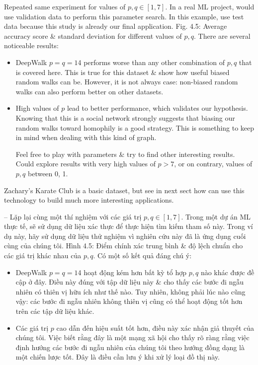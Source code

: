 \documentclass{article}
\begin{document}
\begin{itemize}
\begin{itemize}
        Repeated same experiment for values of $p,q\in[1,7]$. In a real ML project, would use validation data to perform this parameter search. In this example, use test data because this study is already our final application. {\sf Fig. 4.5: Average accuracy score \& standard deviation for different values of $p,q$.} There are several noticeable results:
        \begin{itemize}
            \item DeepWalk $p = q = 1$4 performs worse than any other combination of $p,q$ that is covered here. This is true for this dataset \& show how useful biased random walks can be. However, it is not always case: non-biased random walks can also perform better on other datasets.
            \item High values of $p$ lead to better performance, which validates our hypothesis. Knowing that this is a social network strongly suggests that biasing our random walks toward homophily is a good strategy. This is something to keep in mind when dealing with this kind of graph.

            Feel free to play with parameters \& try to find other interesting results. Could explore results with very high values of $p > 7$, or on contrary, values of $p,q$ between 0, 1.
        \end{itemize}
        Zachary's Karate Club is a basic dataset, but see in next sect how can use this technology to build much more interesting applications.

        -- Lặp lại cùng một thí nghiệm với các giá trị $p,q\in[1,7]$. Trong một dự án ML thực tế, sẽ sử dụng dữ liệu xác thực để thực hiện tìm kiếm tham số này. Trong ví dụ này, hãy sử dụng dữ liệu thử nghiệm vì nghiên cứu này đã là ứng dụng cuối cùng của chúng tôi. {\sf Hình 4.5: Điểm chính xác trung bình \& độ lệch chuẩn cho các giá trị khác nhau của $p,q$.} Có một số kết quả đáng chú ý:
        \begin{itemize}
            \item DeepWalk $p = q = 1$4 hoạt động kém hơn bất kỳ tổ hợp $p,q$ nào khác được đề cập ở đây. Điều này đúng với tập dữ liệu này \& cho thấy các bước đi ngẫu nhiên có thiên vị hữu ích như thế nào. Tuy nhiên, không phải lúc nào cũng vậy: các bước đi ngẫu nhiên không thiên vị cũng có thể hoạt động tốt hơn trên các tập dữ liệu khác.
            \item Các giá trị $p$ cao dẫn đến hiệu suất tốt hơn, điều này xác nhận giả thuyết của chúng tôi. Việc biết rằng đây là một mạng xã hội cho thấy rõ ràng rằng việc định hướng các bước đi ngẫu nhiên của chúng tôi theo hướng đồng dạng là một chiến lược tốt. Đây là điều cần lưu ý khi xử lý loại đồ thị này.


\end{itemize}
\end{itemize}
\end{itemize}
\end{document}
